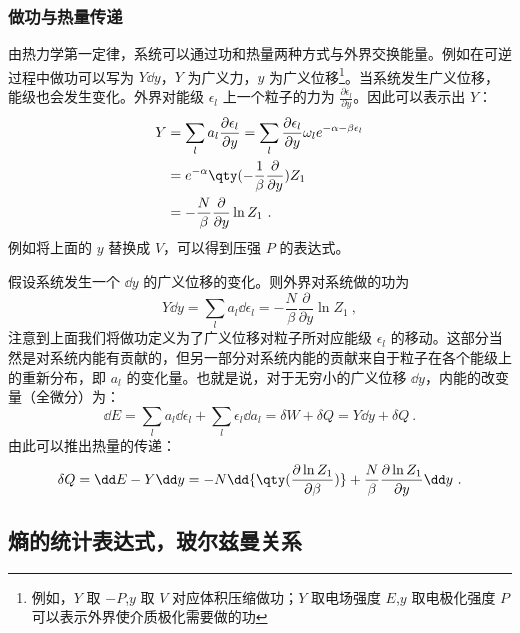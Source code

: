 \subsubsection{做功与热量传递}
由热力学第一定律，系统可以通过功和热量两种方式与外界交换能量。例如在可逆过程中做功可以写为 $Y\dd y$，$Y$ 为广义力，$y$ 为广义位移\footnote{例如，$Y$ 取 $-P$,$y$ 取 $V$ 对应体积压缩做功；$Y$ 取电场强度 $E$,$y$ 取电极化强度 $P$ 可以表示外界使介质极化需要做的功}。当系统发生广义位移，能级也会发生变化。外界对能级 $\epsilon_l$ 上一个粒子的力为 $\frac{\partial \epsilon_l}{\partial y}$。因此可以表示出 $Y$：
\begin{equation}
\begin{aligned}
Y&=\sum_l a_l\frac{\partial \epsilon_l}{\partial y}=\sum_l \frac{\partial \epsilon_l}{\partial y}\omega_le^{-\alpha-\beta\epsilon_l}\\
&=e^{-\alpha}\qty(-\frac{1}{\beta}\frac{\partial }{\partial y})Z_1\\
&=-\frac{N}{\beta}\frac{\partial }{\partial y}\ln Z_1~.
\end{aligned}
\end{equation}
例如将上面的 $y$ 替换成 $V$，可以得到压强 $P$ 的表达式。

假设系统发生一个 $\dd y$ 的广义位移的变化。则外界对系统做的功为
\begin{equation}
Y\dd y=\sum_l a_l\dd \epsilon_l=-\frac{N}{\beta}\frac{\partial }{\partial y}\ln Z_1~,
\end{equation}
注意到上面我们将做功定义为了广义位移对粒子所对应能级 $\epsilon_l$ 的移动。这部分当然是对系统内能有贡献的，但另一部分对系统内能的贡献来自于粒子在各个能级上的重新分布，即 $a_l$ 的变化量。也就是说，对于无穷小的广义位移 $\dd y$，内能的改变量（全微分）为：
\begin{equation}
\dd E=\sum_l a_l\dd \epsilon_l+\sum_l\epsilon_l\dd a_l=\delta W+\delta Q=Y\dd y+\delta Q~.
\end{equation}
由此可以推出热量的传递：
\begin{equation}\label{eq_TheSta_2}
\delta Q=\dd E-Y\dd y=
-N\dd{\qty(\frac{\partial \ln Z_1}{\partial \beta})}+\frac{N}{\beta}\frac{\partial \ln Z_1}{\partial y}\dd y~.
\end{equation}
\subsection{熵的统计表达式，玻尔兹曼关系}
